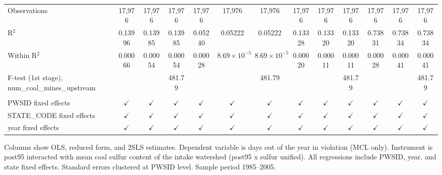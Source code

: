\begin{table}[htbp]
\begin{adjustbox}{width = \textwidth, center}
\begin{tabular}{lcccccccccccc}
         Observations                                      & 17,976        & 17,976        & 17,976        & 17,976        & 17,976                & 17,976                & 17,976        & 17,976        & 17,976        & 17,976        & 17,976        & 17,976\\  
         R$^2$                                             & 0.13996       & 0.13985       & 0.13985       & 0.05240       & 0.05222               & 0.05222               & 0.13328       & 0.13320       & 0.13320       & 0.73831       & 0.73834       & 0.73834\\  
         Within R$^2$                                      & 0.00066       & 0.00054       & 0.00054       & 0.00028       & $8.69\times 10^{-5}$  & $8.69\times 10^{-5}$  & 0.00020       & 0.00011       & 0.00011       & 0.00028       & 0.00041       & 0.00041\\  
         F-test (1st stage), num\_coal\_mines\_upstream    &               &               & 481.79        &               &                       & 481.79                &               &               & 481.79        &               &               & 481.79\\  
         
          \\
         
         PWSID fixed effects                               & $\checkmark$  & $\checkmark$  & $\checkmark$  & $\checkmark$  & $\checkmark$          & $\checkmark$          & $\checkmark$  & $\checkmark$  & $\checkmark$  & $\checkmark$  & $\checkmark$  & $\checkmark$\\   
         STATE\_CODE fixed effects                         & $\checkmark$  & $\checkmark$  & $\checkmark$  & $\checkmark$  & $\checkmark$          & $\checkmark$          & $\checkmark$  & $\checkmark$  & $\checkmark$  & $\checkmark$  & $\checkmark$  & $\checkmark$\\   
         year fixed effects                                & $\checkmark$  & $\checkmark$  & $\checkmark$  & $\checkmark$  & $\checkmark$          & $\checkmark$          & $\checkmark$  & $\checkmark$  & $\checkmark$  & $\checkmark$  & $\checkmark$  & $\checkmark$\\   
         
         \bottomrule
         
      \end{tabular}
      
      
      
   \end{adjustbox}
      {\tiny\linespread{1}\selectfont \par \raggedright 
   Columns show OLS, reduced form, and 2SLS estimates. Dependent variable is days out of the year in violation (MCL only). Instrument is post95 interacted with mean coal sulfur content of the intake watershed (post95 x sulfur unified). All regressions include PWSID, year, and state fixed effects. Standard errors clustered at PWSID level. Sample period 1985--2005.}
   
\end{table}



